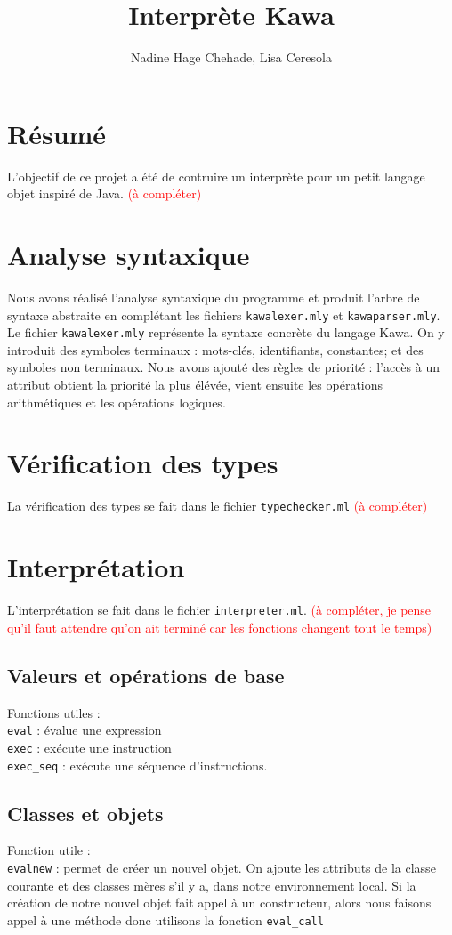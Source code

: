 \documentclass{article}
\title{{\myfont Interprète Kawa}}
\author{Nadine Hage Chehade, Lisa Ceresola}
\date{}
\begin{document}
\maketitle
\tableofcontents
\newpage
\section{Résumé}
L'objectif de ce projet a été de contruire un interprète pour un petit langage objet inspiré de Java. \textcolor{red}{(à compléter)}
\section{Analyse syntaxique}
Nous avons réalisé l'analyse syntaxique du programme et produit l'arbre de syntaxe abstraite en complétant les fichiers \texttt{kawalexer.mly} et \texttt{kawaparser.mly}. Le fichier \texttt{kawalexer.mly} représente la syntaxe concrète du langage Kawa. On y introduit des symboles terminaux :  mots-clés, identifiants, constantes; et des symboles non terminaux. Nous avons ajouté des règles de priorité : l'accès à un attribut obtient la priorité la plus élévée, vient ensuite  les opérations arithmétiques et les opérations logiques.
\section{Vérification des types}
La vérification des types se fait dans le fichier \texttt{typechecker.ml} \textcolor{red}{(à compléter)}
\section{Interprétation}
L'interprétation se fait dans le fichier \texttt{interpreter.ml}. \textcolor{red}{(à compléter, je pense qu'il faut attendre qu'on ait terminé car les fonctions changent tout le temps)}
\subsection{Valeurs et opérations de base}
Fonctions utiles : \\
\texttt{eval} : évalue une expression\\
\texttt{exec} : exécute une instruction\\
\texttt{exec\_seq} : exécute une séquence d'instructions.
\subsection{Classes et objets}
Fonction utile : \smallskip\\
\texttt{evalnew} : permet de créer un nouvel objet.
On ajoute les attributs de la classe courante et des classes mères s'il y a, dans notre environnement local. Si la création de notre nouvel objet fait appel à un constructeur, alors nous faisons appel à une méthode donc utilisons la fonction \texttt{eval\_call}
\end{document}
